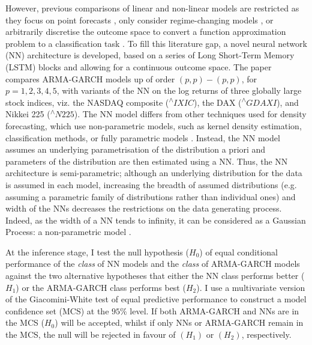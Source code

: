 However, previous comparisons of linear and non-linear models are restricted as they focus on point forecasts \citep{DAHL2004201}, only consider regime-changing models \citep{CLEMENTS2004169}, or arbitrarily discretise the outcome space to convert a function approximation problem to a classification task \citep{IBM-DE-RNN}. To fill this literature gap, a novel neural network (NN) architecture is developed, based on a series of Long Short-Term Memory (LSTM) blocks \citep{LSTM} and allowing for a continuous outcome space. The paper compares ARMA-GARCH models up of order $(p,p)-(p,p)$, for $p=1,2,3,4,5$, with variants of the NN on the log returns of three globally large stock indices, viz. the NASDAQ composite (\textsuperscript{$\wedge$}$IXIC$), the DAX (\textsuperscript{$\wedge$}$GDAXI$), and Nikkei 225 (\textsuperscript{$\wedge$}$N225$). The NN model differs from other techniques used for density forecasting, which use non-parametric models, such as kernel density estimation, classification methods, or fully parametric models \citep{KernelDen, KernelDensity,IBM-DE-RNN}.  Instead, the NN model assumes an underlying parametrisation of the distribution a priori and parameters of the distribution are then estimated using a NN. Thus, the NN architecture is semi-parametric; although an underlying distribution for the data is assumed in each model, increasing the breadth of assumed distributions (e.g. assuming a parametric family of distributions rather than individual ones) and width of the NNs decreases the restrictions on the data generating process. Indeed, as the width of a NN tends to infinity, it can be considered as a Gaussian Process: a non-parametric model \citep{lee2018deep}.

At the inference stage, I test the null hypothesis ($H_0$) of equal conditional performance of the \textit{class} of NN models and the \textit{class} of ARMA-GARCH models against the two alternative hypotheses that either the NN class performs better ($H_1$) or the ARMA-GARCH class performs best ($H_2$). I use a multivariate version of the Giacomini-White test \citep{BorupMGW,GiacominiWhite} of equal predictive performance to construct a model confidence set (MCS) \citep{MCS} at the $95\%$ level. If both ARMA-GARCH and NNs are in the MCS ($H_0$) will be accepted, whilst if only NNs or ARMA-GARCH remain in the MCS, the null will be rejected in favour of $(H_1)$ or $(H_2)$, respectively.
